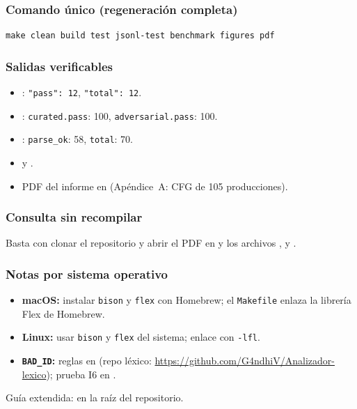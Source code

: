 \subsubsection{Comando único (regeneración completa)}
\begin{verbatim}
make clean build test jsonl-test benchmark figures pdf
\end{verbatim}

\subsubsection{Salidas verificables}
\begin{itemize}
  \item {}: \texttt{"pass": 12}, \texttt{"total": 12}.
  \item {}: \texttt{curated.pass}: 100, \texttt{adversarial.pass}: 100.
  \item {}: \texttt{parse\_ok}: 58, \texttt{total}: 70.
  \item {} y .
  \item PDF del informe en  (Apéndice~A: CFG de 105 producciones).
\end{itemize}

\subsubsection{Consulta sin recompilar}
Basta con clonar el repositorio y abrir el PDF en  y los archivos ,  y .

\subsubsection{Notas por sistema operativo}
\begin{itemize}
  \item \textbf{macOS:} instalar \texttt{bison} y \texttt{flex} con Homebrew; el \texttt{Makefile} enlaza la librería Flex de Homebrew.
  \item \textbf{Linux:} usar \texttt{bison} y \texttt{flex} del sistema; enlace con \texttt{-lfl}.
  \item \textbf{\texttt{BAD\_ID}:} reglas en  (repo léxico: \url{https://github.com/G4ndhiV/Analizador-lexico}); prueba I6 en .
\end{itemize}

Guía extendida:  en la raíz del repositorio.
